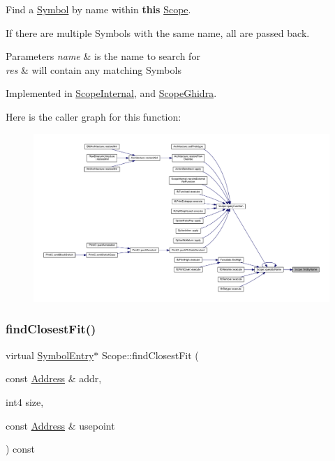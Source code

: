 Find a \mbox{\hyperlink{class_symbol}{Symbol}} by name within {\bfseries{this}} \mbox{\hyperlink{class_scope}{Scope}}. 

If there are multiple Symbols with the same name, all are passed back. 
\begin{DoxyParams}{Parameters}
{\em name} & is the name to search for \\
\hline
{\em res} & will contain any matching Symbols \\
\hline
\end{DoxyParams}


Implemented in \mbox{\hyperlink{class_scope_internal_a06599bc2d7c1ccfd18f0e91a5ee956ca}{Scope\+Internal}}, and \mbox{\hyperlink{class_scope_ghidra_a26072ceb4215a022050d12b9487e3e87}{Scope\+Ghidra}}.

Here is the caller graph for this function\+:
\nopagebreak
\begin{figure}[H]
\begin{center}
\leavevmode
\includegraphics[width=350pt]{class_scope_a979222d28577e6e8d07e35f12d38bff7_icgraph}
\end{center}
\end{figure}
\mbox{\label{class_scope_ab679fe786be2fb949af78054cb2041a8}} 
\subsubsection{\texorpdfstring{findClosestFit()}{findClosestFit()}}
{\footnotesize\ttfamily virtual \mbox{\hyperlink{class_symbol_entry}{Symbol\+Entry}}$\ast$ Scope\+::find\+Closest\+Fit (\begin{DoxyParamCaption}\item[{const \mbox{\hyperlink{class_address}{Address}} \&}]{addr,  }\item[{int4}]{size,  }\item[{const \mbox{\hyperlink{class_address}{Address}} \&}]{usepoint }\end{DoxyParamCaption}) const\hspace{0.3cm}{\ttfamily [pure virtual]}}



